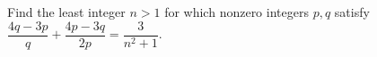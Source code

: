 Find the least integer $n>1$ for which nonzero integers $p,q$ satisfy $\dfrac{4q-3p}{q}+\dfrac{4p-3q}{2p}=\dfrac{3}{n^2+1}$.
